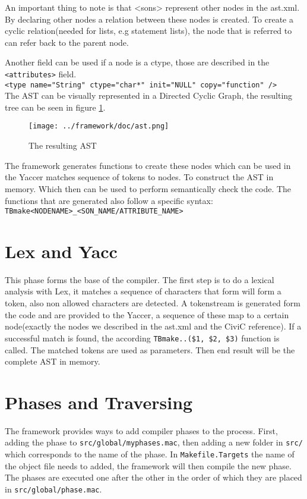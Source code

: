\documentclass[a4paper]{article}
\begin{document}
An important thing to note is that <sons> represent other nodes in the ast.xml.
By declaring other nodes a relation between these nodes is created. To create a cyclic
relation(needed for lists, e.g statement lists), the node that is referred to can refer back to the parent node.

Another field can be used if a node is a ctype, those are described in the \texttt{<attributes>} field.\\
\texttt{<type name="String" ctype="char*" init="NULL" copy="function" />}
\\
The AST can be visually represented in a Directed Cyclic Graph, the resulting
tree can be seen in figure \ref{fig:ast.png}.

\begin{figure}[h!]
    \texttt{[image: ../framework/doc/ast.png]}
\label{fig:ast.png}
\caption{The resulting AST}
\end{figure}

The framework generates functions to create these nodes which can be used in
the Yaccer matches sequence of tokens to nodes. To construct the AST in memory.
Which then can be used to perform semantically check the code. The functions
that are generated also follow a specific syntax:\\
\texttt{TBmake<NODENAME>\_<SON\_NAME/ATTRIBUTE\_NAME>}

\section{Lex and Yacc}
This phase forms the base of the compiler. The first step is to do a lexical
analysis with Lex, it matches a sequence of characters that form will form a
token, also non allowed characters are detected. A tokenstream is generated
form the code and are provided to the Yaccer, a sequence of these map to a
certain node(exactly the nodes we described in the ast.xml and the CiviC
reference). If a successful match is found, the according \texttt{TBmake..(\$1, \$2, \$3)} function is called. The
matched tokens are used as parameters. Then end result will be the complete AST
in memory.

\section{Phases and Traversing}
The framework provides ways to add compiler phases to the process. First,
adding the phase to \texttt{src/global/myphases.mac}, then adding a new folder
in \texttt{src/} which corresponds to the name of the phase. In
\texttt{Makefile.Targets} the name of the object file needs to added, the
framework will then compile the new phase. The phases are executed one after
the other in the order of which they are placed in \texttt{src/global/phase.mac}.
\end{document}

